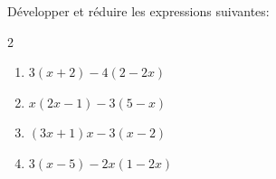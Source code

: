 \begin{exo}[Développement]
	Développer et réduire les expressions suivantes:
	\vspace*{-2mm}
	\begin{multicols}{2}
		\begin{enumerate}[label=\alph*)]
			\item $3(x + 2) - 4(2 - 2x)$
			\item $x(2x - 1) - 3(5 - x)$
			\item $(3x + 1)x - 3(x - 2)$
			\item $3(x - 5) - 2x(1 - 2x)$
		\end{enumerate}
	\end{multicols}
\end{exo}

